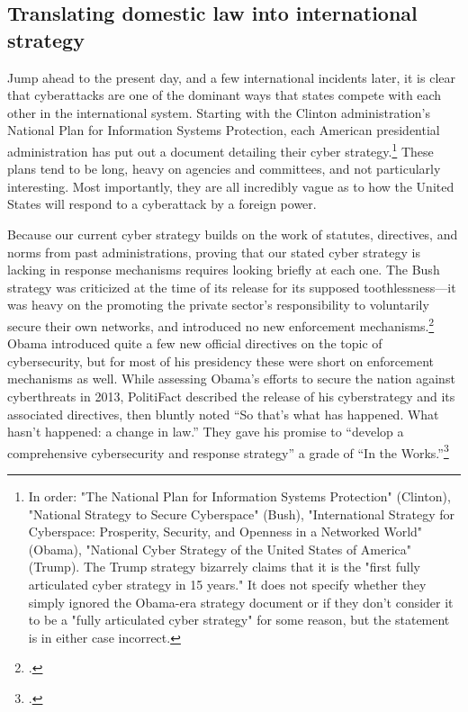 \documentclass[12pt]{article}
\begin{document}
\subsection{Translating domestic law into international strategy}
Jump ahead to the present day, and a few international incidents later, it is clear that cyberattacks are one of the dominant ways that states compete with each other in the international system. Starting with the Clinton administration's National Plan for Information Systems Protection, each American presidential administration has put out a document detailing their cyber strategy.\footnote{In order: "The National Plan for Information Systems Protection" (Clinton), "National Strategy to Secure Cyberspace" (Bush), "International Strategy for Cyberspace: Prosperity, Security, and Openness in a Networked World" (Obama), "National Cyber Strategy of the United States of America" (Trump). The Trump strategy bizarrely claims that it is the "first fully articulated cyber strategy in 15 years." It does not specify whether they simply ignored the Obama-era strategy document or if they don't consider it to be a "fully articulated cyber strategy" for some reason, but the statement is in either case incorrect.} These plans tend to be long, heavy on agencies and committees, and not particularly interesting. Most importantly, they are all incredibly vague as to how the United States will respond to a cyberattack by a foreign power. 

Because our current cyber strategy builds on the work of statutes, directives, and norms from past administrations, proving that our stated cyber strategy is lacking in response mechanisms requires looking briefly at each one. The Bush strategy was criticized at the time of its release for its supposed toothlessness---it was heavy on the promoting the private sector's responsibility to voluntarily secure their own networks, and introduced no new enforcement mechanisms.\footcite{lemos_bush_2003} Obama introduced quite a few new official directives on the topic of cybersecurity, but for most of his presidency these were short on enforcement mechanisms as well. While assessing Obama's efforts to secure the nation against cyberthreats in 2013, PolitiFact described the release of his cyberstrategy and its associated directives, then bluntly noted ``So that's what has happened. What hasn't happened: a change in law.'' They gave his promise to ``develop a comprehensive cybersecurity and response strategy'' a grade of ``In the Works.''\footcite{moorhead_work_2013}
\end{document}

